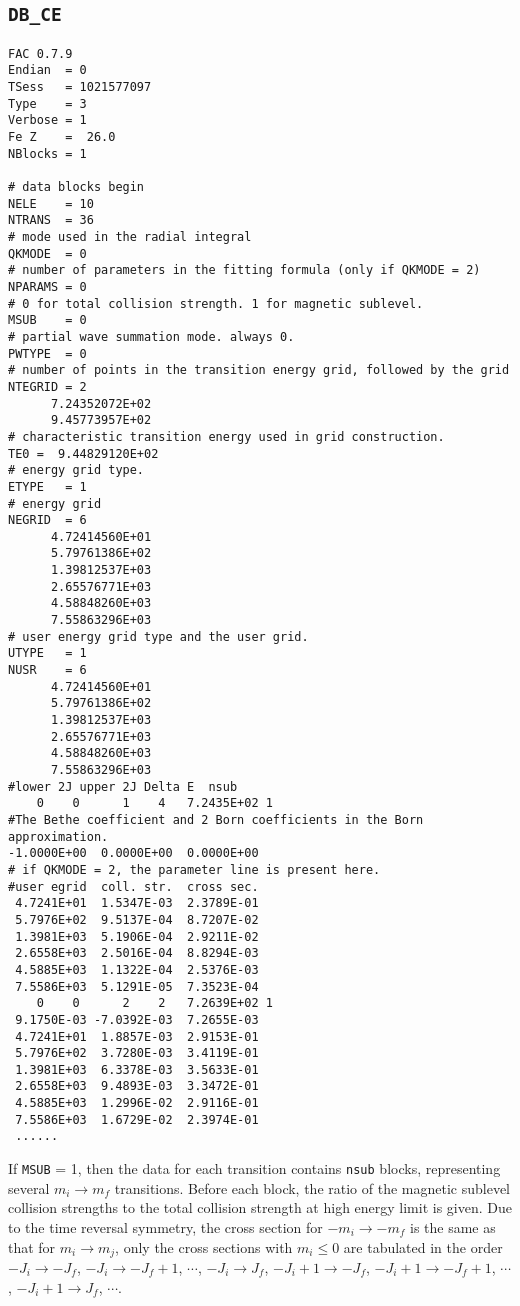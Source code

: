 \subsection{\texttt{DB\_CE}}
\begin{verbatim}
FAC 0.7.9
Endian	= 0
TSess	= 1021577097
Type	= 3
Verbose	= 1
Fe Z	=  26.0
NBlocks	= 1

# data blocks begin
NELE	= 10
NTRANS	= 36
# mode used in the radial integral
QKMODE	= 0
# number of parameters in the fitting formula (only if QKMODE = 2)
NPARAMS	= 0
# 0 for total collision strength. 1 for magnetic sublevel.
MSUB	= 0
# partial wave summation mode. always 0. 
PWTYPE	= 0
# number of points in the transition energy grid, followed by the grid
NTEGRID	= 2
	  7.24352072E+02
	  9.45773957E+02
# characteristic transition energy used in grid construction.
TE0	=  9.44829120E+02
# energy grid type. 
ETYPE	= 1
# energy grid
NEGRID	= 6
	  4.72414560E+01
	  5.79761386E+02
	  1.39812537E+03
	  2.65576771E+03
	  4.58848260E+03
	  7.55863296E+03
# user energy grid type and the user grid.
UTYPE	= 1
NUSR	= 6
	  4.72414560E+01
	  5.79761386E+02
	  1.39812537E+03
	  2.65576771E+03
	  4.58848260E+03
	  7.55863296E+03
#lower 2J upper 2J Delta E  nsub
    0	 0	    1	 4	 7.2435E+02	1
#The Bethe coefficient and 2 Born coefficients in the Born approximation.
-1.0000E+00  0.0000E+00  0.0000E+00
# if QKMODE = 2, the parameter line is present here.
#user egrid  coll. str.  cross sec.
 4.7241E+01	 1.5347E-03	 2.3789E-01
 5.7976E+02	 9.5137E-04	 8.7207E-02
 1.3981E+03	 5.1906E-04	 2.9211E-02
 2.6558E+03	 2.5016E-04	 8.8294E-03
 4.5885E+03	 1.1322E-04	 2.5376E-03
 7.5586E+03	 5.1291E-05	 7.3523E-04
    0	 0	    2	 2	 7.2639E+02	1
 9.1750E-03 -7.0392E-03  7.2655E-03
 4.7241E+01	 1.8857E-03	 2.9153E-01
 5.7976E+02	 3.7280E-03	 3.4119E-01
 1.3981E+03	 6.3378E-03	 3.5633E-01
 2.6558E+03	 9.4893E-03	 3.3472E-01
 4.5885E+03	 1.2996E-02	 2.9116E-01
 7.5586E+03	 1.6729E-02	 2.3974E-01
 ......
\end{verbatim}

If \texttt{MSUB} = 1, then the data for each transition contains \texttt{nsub}
blocks, representing several $m_i\to m_f$ transitions. Before each block, the
ratio of the magnetic sublevel collision strengths to the total collision
strength at high energy limit is given. Due to the time
reversal symmetry, the cross section for $-m_i \to -m_f$ is the same as that
for $m_i \to m_j$, only the cross sections with $m_i \le 0$ are tabulated in
the order $-J_i\to -J_f$, $-J_i\to -J_f+1$, $\cdots$, $-J_i\to J_f$,
$-J_i+1\to -J_f$, $-J_i+1\to -J_f+1$, $\cdots$, $-J_i+1\to J_f$, $\cdots$.


